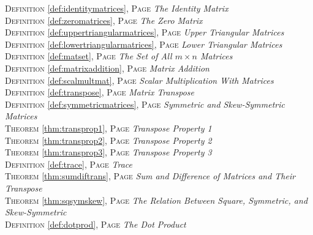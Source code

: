 \begin{multicols}{2}
{\textsc{Definition} \ref{def:identitymatrices}, \textsc{Page} \pageref{def:identitymatrices} \textit{The Identity Matrix} \\
\textsc{Definition} \ref{def:zeromatrices}, \textsc{Page} \pageref{def:zeromatrices} \textit{The Zero Matrix} \\
\textsc{Definition} \ref{def:uppertriangularmatrices}, \textsc{Page} \pageref{def:uppertriangularmatrices} \textit{Upper Triangular Matrices} \\
\textsc{Definition} \ref{def:lowertriangularmatrices}, \textsc{Page} \pageref{def:lowertriangularmatrices} \textit{Lower Triangular Matrices} \\
\textsc{Definition} \ref{def:matset}, \textsc{Page} \pageref{def:matset} \textit{The Set of All \(m\times n\) Matrices} \\
\textsc{Definition} \ref{def:matrixaddition}, \textsc{Page} \pageref{def:matrixaddition} \textit{Matrix Addition} \\
\textsc{Definition} \ref{def:scalmultmat}, \textsc{Page} \pageref{def:scalmultmat} \textit{Scalar Multiplication With Matrices} \\
\textsc{Definition} \ref{def:transpose}, \textsc{Page} \pageref{def:transpose} \textit{Matrix Transpose} \\
\textsc{Definition} \ref{def:symmetricmatrices}, \textsc{Page} \pageref{def:symmetricmatrices} \textit{Symmetric and Skew-Symmetric Matrices} \\
\textsc{Theorem} \ref{thm:transprop1}, \textsc{Page} \pageref{thm:transprop1} \textit{Transpose Property 1} \\
\textsc{Theorem} \ref{thm:transprop2}, \textsc{Page} \pageref{thm:transprop2} \textit{Transpose Property 2} \\
\textsc{Theorem} \ref{thm:transprop3}, \textsc{Page} \pageref{thm:transprop3} \textit{Transpose Property 3} \\
\textsc{Definition} \ref{def:trace}, \textsc{Page} \pageref{def:trace} \textit{Trace} \\
\textsc{Theorem} \ref{thm:sumdiftrans}, \textsc{Page} \pageref{thm:sumdiftrans} \textit{Sum and Difference of Matrices and Their Transpose} \\
\textsc{Theorem} \ref{thm:sqsymskew}, \textsc{Page} \pageref{thm:sqsymskew} \textit{The Relation Between Square, Symmetric, and Skew-Symmetric} \\
\textsc{Definition} \ref{def:dotprod}, \textsc{Page} \pageref{def:dotprod} \textit{The Dot Product} \\
}
\end{multicols}
